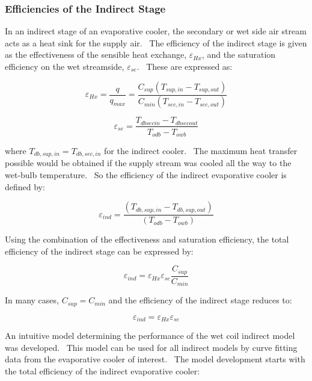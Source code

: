 \subsubsection{Efficiencies of the Indirect Stage}\label{efficiencies-of-the-indirect-stage}

In an indirect stage of an evaporative cooler, the secondary or wet side air stream acts as a heat sink for the supply air.~ The efficiency of the indirect stage is given as the effectiveness of the sensible heat exchange, \({\varepsilon_{Hx}}\), and the saturation efficiency on the wet streamside, \({\varepsilon_{se}}\).~ These are expressed as:

\begin{equation}
{\varepsilon_{Hx}} = \frac{q}{{{q_{max}}}} = \frac{{{C_{sup}}({T_{sup,in}} - {T_{sup,out}})}}{{{C_{min}}({T_{sec,in}} - {T_{sec,out}})}}
\end{equation}

\begin{equation}
{\varepsilon_{se}} = \frac{{T_{dbsecin}} - {T_{dbsecout}}}{{T_{odb}} - {T_{owb}}}
\end{equation}

where \(T_{db,sup,in} = T_{db,sec,in}\) for the indirect cooler.~ The maximum heat transfer possible would be obtained if the supply stream was cooled all the way to the wet-bulb temperature.~ So the efficiency of the indirect evaporative cooler is defined by:

\begin{equation}
{\varepsilon_{ind}} = \frac{{({T_{db,sup,in}} - {T_{db,sup,out}})}}{{({T_{odb}} - {T_{owb}})}}
\end{equation}

Using the combination of the effectiveness and saturation efficiency, the total efficiency of the indirect stage can be expressed by:

\begin{equation}
{\varepsilon_{ind}} = {\varepsilon_{Hx}} {\varepsilon_{se}} \frac{C_{sup}}{C_{min}}
\end{equation}

In many cases, \(C_{sup} = C_{min}\) and the efficiency of the indirect stage reduces to:

\begin{equation}
{\varepsilon_{ind}} = {\varepsilon_{Hx}} {\varepsilon_{se}}
\end{equation}

An intuitive model determining the performance of the wet coil indirect model was developed.~ This model can be used for all indirect models by curve fitting data from the evaporative cooler of interest.~ The model development starts with the total efficiency of the indirect evaporative cooler:

